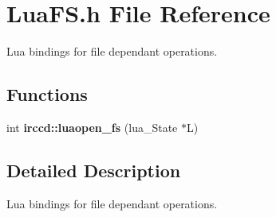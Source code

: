 \hypertarget{a00091}{\section{Lua\-F\-S.\-h File Reference}
\label{a00091}
}


Lua bindings for file dependant operations.  


\subsection*{Functions}
\begin{DoxyCompactItemize}
\item 
int {\bfseries irccd\-::luaopen\-\_\-fs} (lua\-\_\-\-State $\ast$L)
\end{DoxyCompactItemize}


\subsection{Detailed Description}
Lua bindings for file dependant operations. 